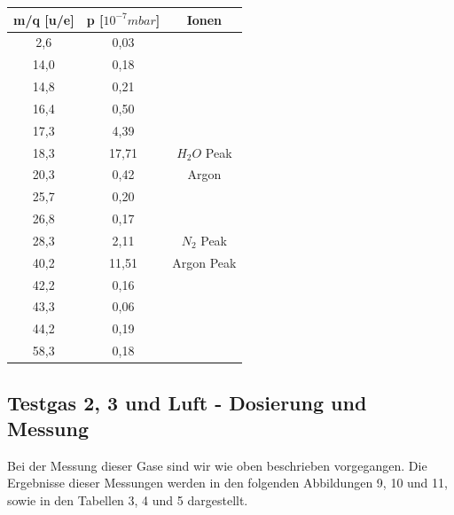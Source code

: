 
\begin{center}
\begin{tabular}{c|c|c}
m/q [u/e] & p [$10^{-7} mbar$] & Ionen\\	
\hline	
2,6 & 0,03	&\\	
14,0 & 0,18	&\\	
14,8 & 0,21	&\\	
16,4 & 0,50	&\\	
17,3 & 4,39	&\\	
18,3 & 17,71 & $H_2O$ Peak\\
20,3 & 0,42	& Argon\\
25,7 & 0,20	&\\
26,8 & 0,17	&\\
28,3 & 2,11	& $N_2$ Peak\\
40,2 & 11,51 & Argon Peak\\
42,2 & 0,16	&\\
43,3 & 0,06	&\\
44,2 & 0,19	&\\
58,3 & 0,18	&\\
\end{tabular}
\end{center}

\subsection{Testgas 2, 3 und Luft - Dosierung und Messung}
Bei der Messung dieser Gase sind wir wie oben beschrieben vorgegangen. Die Ergebnisse dieser Messungen werden in den folgenden Abbildungen 9, 10 und 11, sowie in den Tabellen 3, 4 und 5 dargestellt.


